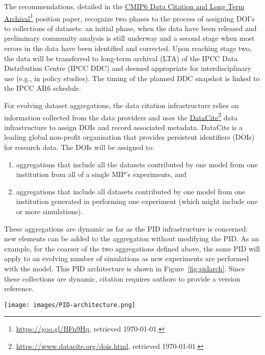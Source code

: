 \documentclass[gmd,manuscript]{copernicus}
\newcommand{\urlref}[2] {\href{#1}{#2}\footnote{\url{#1}, retrieved \today.}}
\begin{document}
The recommendations, detailed in the
\urlref{https://goo.gl/BFn9Hq}{CMIP6 Data Citation and Long Term
  Archival} position paper, recognize two phases to the process of
assigning DOI's to collections of datasets: an initial phase, when the
data have been released and preliminary community analysis is still
underway and a second stage when most errors in the data have been
identified and corrected. Upon reaching stage two, the data will be
transferred to long-term archival (LTA) of the IPCC Data Distribution
Centre (IPCC DDC) and deemed appropriate for interdisciplinary use
(e.g., in policy studies). The timing of the planned DDC snapshot is
linked to the IPCC AR6 schedule.

For evolving dataset aggregations, the data citation infrastructure
relies on information collected from the data providers and uses the
\urlref{https://www.datacite.org/dois.html}{DataCite} data
infrastructure to assign DOIs and record associated metadata.
DataCite is a leading global non-profit organisation that provides
persistent identifiers (DOIs) for research data. The DOIs will be
assigned to:

\begin{enumerate}
\item aggregations that include all the datasets contributed by one
  model from one institution from all of a single MIP's experiments,
  and
\item aggregations that include all datasets contributed by one model
  from one institution generated in performing one experiment (which
  might include one or more simulations).
\end{enumerate}

These aggregations are dynamic as far as the PID infrastructure is
concerned: new elements can be added to the aggregation without
modifying the PID. As an example, for the coarser of the two
aggregations defined above, the same PID will apply to an evolving
number of simulations as new experiments are performed with the model.
This PID architecture is shown in Figure~\ref{fig:pidarch}. Since these
collections are dynamic, citation requires authors to provide a
version reference.

\begin{figure*}
  \begin{center}
    \texttt{[image: images/PID-architecture.png]}
  \end{center}
  \caption{PID architecture, showing layers in the PID hierarchy. In
    the lower layers of the hierarchy, PIDs are static once generated,
    and new datasets generate new versions with new PIDs.}
  \label{fig:pidarch}
\end{figure*}
\end{document}
